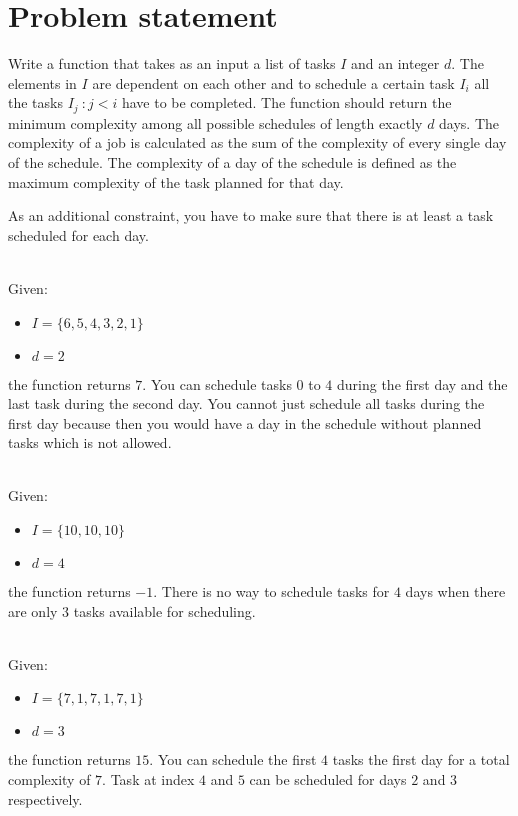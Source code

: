 \section{Problem statement}
\begin{exercise}
    Write a function that takes as an input a list of tasks $I$ and an integer $d$. The elements in
    $I$ are dependent on each other and to schedule a certain task $I_i$ all the tasks $I_j \: : j <
    i$ have to be completed. The function should return the minimum complexity among all possible
    schedules of length exactly $d$ days. The complexity of a job is calculated as the sum of the
    complexity of every single day of the schedule. The complexity of a day of the schedule is
    defined as the maximum complexity of the task planned for that day.

    As an additional constraint, you have to make sure that there is at least a task scheduled for
    each day.
        
    \begin{example}
        \hfill \\
        Given:
        \begin{itemize}
            \item $I = \{6,5,4,3,2,1\}$
            \item $d = 2$
        \end{itemize}
        the function returns $7$. You can schedule tasks $0$ to $4$ during the first day and the
        last task during the second day. You cannot just schedule all tasks during the first day
        because then you would have a day in the schedule without planned tasks which is not
        allowed.
    \end{example}
    
    \begin{example}
        \hfill \\
        Given:
        \begin{itemize}
            \item $I = \{10,10,10\}$
            \item $d = 4$
        \end{itemize}
        the function returns $-1$. There is no way to schedule tasks for $4$ days when there are
        only $3$ tasks available for scheduling.
    \end{example}

        
    \begin{example}
        \hfill \\
        Given:
        \begin{itemize}
            \item $I = \{7,1,7,1,7,1\}$
            \item $d = 3$
        \end{itemize}
        the function returns $15$. You can schedule the first $4$ tasks the first day for a total
        complexity of $7$. Task at index $4$ and $5$ can be scheduled for days $2$ and $3$
        respectively. 


\end{example}
\end{exercise}
